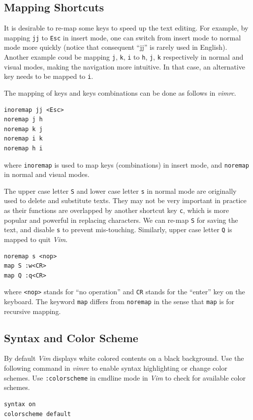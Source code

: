 \subsection{Mapping Shortcuts}

It is desirable to re-map some keys to speed up the text editing. For example, by mapping \verb|jj| to \verb|Esc| in insert mode, one can switch from insert mode to normal mode more quickly (notice that consequent ``jj'' is rarely used in English). Another example coud be mapping \verb|j|, \verb|k|, \verb|i| to \verb|h|, \verb|j|, \verb|k| respectively in normal and visual modes, making the navigation more intuitive. In that case, an alternative key needs to be mapped to \verb|i|.

The mapping of keys and keys combinations can be done as follows in \textit{vimrc}.
\begin{lstlisting}
inoremap jj <Esc>
noremap j h
noremap k j
noremap i k
noremap h i
\end{lstlisting}
where \verb|inoremap| is used to map keys (combinations) in insert mode, and \verb|noremap| in normal and visual modes.

The upper case letter \verb|S| and lower case letter \verb|s| in normal mode are originally used to delete and substitute texts. They may not be very important in practice as their functions are overlapped by another shortcut key \verb|c|, which is more popular and powerful in replacing characters. We can re-map \verb|S| for saving the text, and disable \verb|s| to prevent mis-touching. Similarly, upper case letter \verb|Q| is mapped to quit \textit{Vim}.
\begin{lstlisting}
noremap s <nop>
map S :w<CR>
map Q :q<CR>
\end{lstlisting}
where \verb|<nop>| stands for ``no operation'' and \verb|CR| stands for the ``enter'' key on the keyboard. The keyword \verb|map| differs from \verb|noremap| in the sense that \verb|map| is for recursive mapping.

\subsection{Syntax and Color Scheme}

By default \textit{Vim} displays white colored contents on a black background. Use the following command in \textit{vimrc} to enable syntax highlighting or change color schemes. Use \verb|:colorscheme| in cmdline mode in \textit{Vim} to check for available color schemes.
\begin{lstlisting}
syntax on
colorscheme default
\end{lstlisting}

